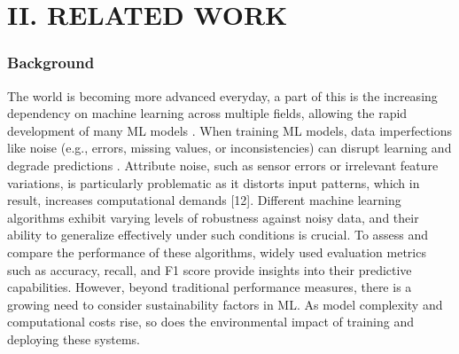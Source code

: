 \documentclass[conference]{IEEEtran}
\begin{document}
\section*{II. RELATED WORK}
\subsubsection*{Background} The world is becoming more advanced everyday, a part of this is the increasing dependency on machine learning across multiple fields, allowing the rapid development of many ML models \cite{bain_ai_sustainability}. When training ML models, data imperfections like noise (e.g., errors, missing values, or inconsistencies) can disrupt learning and degrade predictions \cite{sciencedirect_noise}. Attribute noise, such as sensor errors or irrelevant feature variations, is particularly problematic as it distorts input patterns, which in result, increases computational demands [12]. Different machine learning algorithms exhibit varying levels of robustness against noisy data, and their ability to generalize effectively under such conditions is crucial. To assess and compare the performance of these algorithms, widely used evaluation metrics such as accuracy, recall, and F1 score provide insights into their predictive capabilities. However, beyond traditional performance measures, there is a growing need to consider sustainability factors in ML. As model complexity and computational costs rise, so does the environmental impact of training and deploying these systems. 
\newline
\newline
\end{document}
